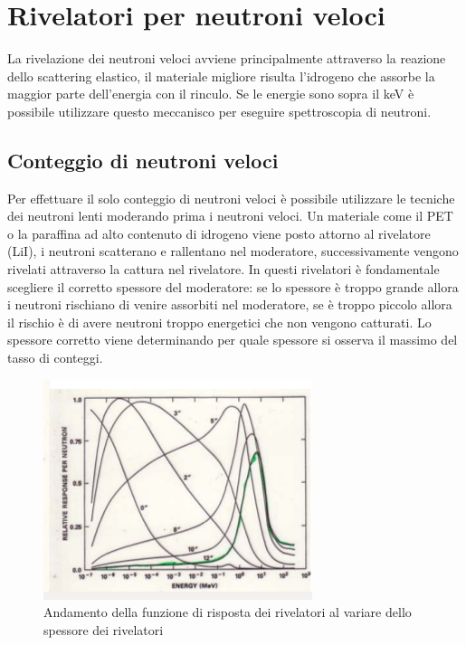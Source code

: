 \chapter{Rivelatori per neutroni veloci}
La rivelazione dei neutroni veloci avviene principalmente attraverso la reazione dello scattering elastico, il materiale migliore risulta
l'idrogeno che assorbe la maggior parte dell'energia con il rinculo.
Se le energie sono sopra il keV \`e possibile utilizzare questo meccanisco per eseguire spettroscopia di neutroni.
\section{Conteggio di neutroni veloci}
Per effettuare il solo conteggio di neutroni veloci \`e possibile utilizzare le tecniche dei neutroni lenti moderando prima i neutroni veloci.
Un materiale come il PET o la paraffina ad alto contenuto di idrogeno viene posto attorno al rivelatore (LiI), i neutroni scatterano e rallentano
nel moderatore, successivamente vengono rivelati attraverso la cattura nel rivelatore.
In questi rivelatori \`e fondamentale scegliere il corretto spessore del moderatore: se lo spessore \`e troppo grande allora i neutroni rischiano
di venire assorbiti nel moderatore, se \`e troppo piccolo allora il rischio \`e di avere neutroni troppo energetici che non vengono catturati.
Lo spessore corretto viene determinando per quale spessore si osserva il massimo del tasso di conteggi.
\begin{figure}[htbp]
\begin{center}
\includegraphics[scale=1]{./Immagini/Moderatori.png}
\caption{Andamento della funzione di risposta dei rivelatori al variare dello spessore dei rivelatori}
\label{fig:moderatori}
\end{center}
\end{figure}
